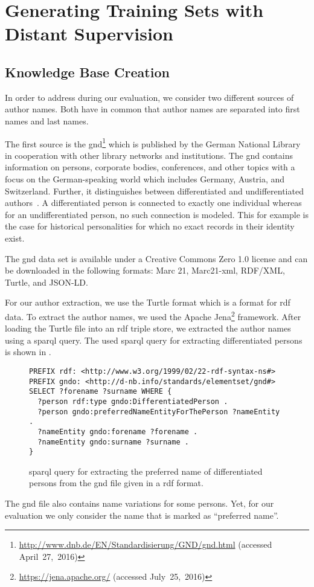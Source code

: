 \section{Generating Training Sets with Distant Supervision}\label{sec:i-distant-supervision}

\subsection{Knowledge Base Creation}\label{subsec:i-knowledge-base-creation}

In order to address  during our evaluation, we consider two different sources of author names.
Both have in common that author names are separated into first names and last names.

\bigskip

The first source is the \acrfull{gnd}\footnote{\url{http://www.dnb.de/EN/Standardisierung/GND/gnd.html} (accessed April~27,~2016)} which is published by the German National Library in cooperation with other library networks and institutions.
The \gls{gnd} contains information on persons, corporate bodies, conferences, and other topics with a focus on the German-speaking world which includes Germany, Austria, and Switzerland.
Further, it distinguishes between differentiated and undifferentiated authors~\citep{hochstein2013ihr}.
A differentiated person is connected to exactly one individual whereas for an undifferentiated person, no such connection is modeled.
This for example is the case for historical personalities for which no exact records in their identity exist.

The \gls{gnd} data set is available under a Creative Commons Zero 1.0 license and can be downloaded in the following formats: Marc 21, Marc21-xml, RDF/XML, Turtle, and JSON-LD.\@

For our author extraction, we use the Turtle format which is a format for \gls{rdf} data.
To extract the author names, we used the Apache Jena\footnote{\url{https://jena.apache.org/} (accessed July~25,~2016)} framework.
After loading the Turtle file into an \gls{rdf} triple store, we extracted the author names using a \gls{sparql} query.
The used \gls{sparql} query for extracting differentiated persons is shown in .
\begin{figure}[t]
\begin{lstlisting}[basicstyle=\ttfamily]
PREFIX rdf: <http://www.w3.org/1999/02/22-rdf-syntax-ns#>
PREFIX gndo: <http://d-nb.info/standards/elementset/gnd#>
SELECT ?forename ?surname WHERE {
  ?person rdf:type gndo:DifferentiatedPerson .
  ?person gndo:preferredNameEntityForThePerson ?nameEntity .
  ?nameEntity gndo:forename ?forename .
  ?nameEntity gndo:surname ?surname .
}
\end{lstlisting}
\caption{\gls{sparql} query for extracting the preferred name of differentiated persons from the \gls{gnd} file given in a \gls{rdf} format.}
\label{fig:gnd-sparql-query}
\end{figure}
The \gls{gnd} file also contains name variations for some persons.
Yet, for our evaluation we only consider the name that is marked as ``preferred name''.

